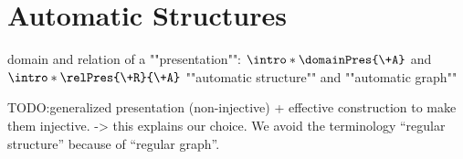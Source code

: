 \section{Automatic Structures}
\label{sec:preliminaries-automatic-structures-automatic-structures}

\begin{itemize}
	\itemAP domain and relation of a ""presentation"": $\intro*\domainPres{\+A}$ and $\intro*\relPres{\+R}{\+A}$ 
	\itemAP ""automatic structure"" and ""automatic graph""
\end{itemize}

TODO:generalized presentation (non-injective) + effective construction to make them injective.
-> this explains our choice. We avoid the terminology ``regular structure'' because of
``regular graph''.

